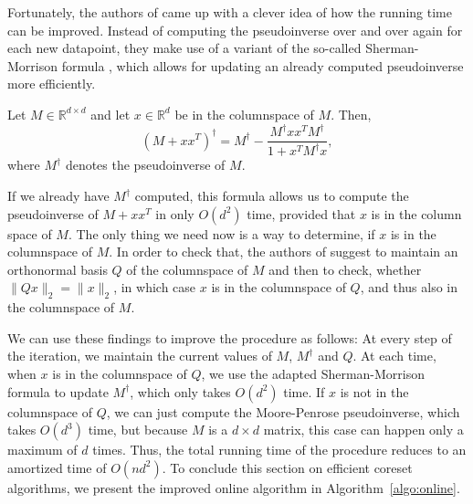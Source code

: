 Fortunately, the authors of \cite{tensor-factorization} came up
with a clever idea of how the running time can be improved.
Instead of computing the pseudoinverse over and over again for
each new datapoint, they make use of a variant of the so-called
Sherman-Morrison formula \cite{sherman-morrison},
which allows for updating an already
computed pseudoinverse more efficiently.

\begin{lemma}
    Let $M \in \mathbb{R}^{d \times d}$ and let $x \in \mathbb{R}^d$
    be in the columnspace of $M$. Then,
    \begin{equation*}
        (M + xx^T)^\dagger = M^\dagger -
        \frac{M^\dagger x x^T M^\dagger}{1 + x^TM^\dagger x},
    \end{equation*}
    where $M^\dagger$ denotes the pseudoinverse of $M$.
\end{lemma}

If we already have $M^\dagger$ computed, this formula allows us
to compute the pseudoinverse of $M + xx^T$ in only $O(d^2)$
time, provided that $x$ is in the column space of $M$.
The only thing we need now is a way to determine, if $x$
is in the columnspace of $M$.
In order to check that, the authors of \cite{tensor-factorization}
suggest to maintain an orthonormal basis $Q$ of the columnspace
of $M$ and then to check, whether
$\lVert Qx \rVert_2 = \lVert x \rVert_2$, in which case $x$ is
in the columnspace of $Q$, and thus also in the columnspace of
$M$.

We can use these findings to improve the procedure as follows:
At every step of the iteration, we maintain the current values
of $M$, $M^\dagger$ and $Q$. At each time, when $x$ is in the
columnspace of $Q$, we use the adapted Sherman-Morrison
formula to update $M^\dagger$, which only takes $O(d^2)$
time. If $x$ is not in the columnspace of $Q$, we can
just compute the Moore-Penrose pseudoinverse, which takes
$O(d^3)$ time, but because $M$ is a $d \times d$ matrix,
this case can happen only a maximum of $d$ times.
Thus, the total running time of the procedure reduces
to an amortized time of $O(nd^2)$.
To conclude this section on efficient coreset algorithms,
we present the improved online algorithm in
Algorithm~\ref{algo:online}.

